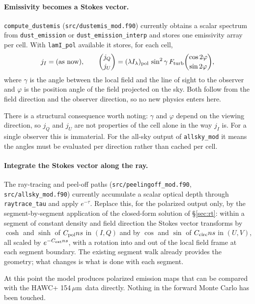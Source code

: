 \documentclass{my_memo}
\newcommand{\code}[1]{\texttt{#1}}
\newcommand{\um}{\ensuremath{\,\mu\mathrm{m}}}
\newcommand{\Cext}{\ensuremath{C_{\rm ext}}}
\newcommand{\Cpol}{\ensuremath{C_{\rm pol}}}
\newcommand{\lamIpol}{\ensuremath{(\lambda I_\lambda)_{\rm pol}}}
\begin{document}
\paragraph{Emissivity becomes a Stokes vector.}
\code{compute\_dustemis} (\code{src/dustemis\_mod.f90}) currently
obtains a scalar spectrum from \code{dust\_emission} or
\code{dust\_emission\_interp} and stores one emissivity array per cell.
With \code{lamI\_pol} available it stores, for each cell,
%
\begin{equation}
j_I = \hbox{(as now)},\qquad
\binom{j_Q}{j_U} = \lamIpol \, \sin^2\gamma \, F_{\rm turb}
   \binom{\cos 2\varphi}{\sin 2\varphi},
\label{eq:jstokes}
\end{equation}
%
where $\gamma$ is the angle between the local field and the line of
sight to the observer and $\varphi$ is the position angle of the
field projected on the sky. Both follow from the field direction and the
observer direction, so no new physics enters here.

There is a structural consequence worth noting: $\gamma$ and $\varphi$
depend on the viewing direction, so $j_Q$ and $j_U$ are not properties
of the cell alone in the way $j_I$ is. For a single observer this is
immaterial. For the all-sky output of \code{allsky\_mod} it means the
angles must be evaluated per direction rather than cached per cell.

\paragraph{Integrate the Stokes vector along the ray.} The ray-tracing
and peel-off paths (\code{src/peelingoff\_mod.f90},
\code{src/allsky\_mod.f90}) currently accumulate a scalar optical depth
through \code{raytrace\_tau} and apply $e^{-\tau}$. Replace this, for
the polarized output only, by the segment-by-segment application of the
closed-form solution of \S\ref{sec:rt}: within a segment of constant
density and field direction the Stokes vector transforms by
$\cosh$ and $\sinh$ of $\Cpol n s$ in $(I,Q)$ and by $\cos$ and $\sin$
of $C_{\rm circ} n s$ in $(U,V)$, all scaled by $e^{-\Cext n s}$, with a
rotation into and out of the local field frame at each segment boundary.
The existing segment walk already provides the geometry; what changes is
what is done with each segment.

At this point the model produces polarized emission maps that can be
compared with the HAWC+ 154\um\ data directly. Nothing in the forward
Monte Carlo has been touched.
\end{document}
